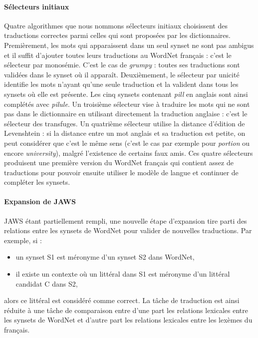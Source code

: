 \paragraph{Sélecteurs initiaux} Quatre algorithmes que nous nommons sélecteurs
initiaux choisissent des traductions correctes parmi celles qui sont proposées
par les dictionnaires. Premièrement, les mots qui apparaissent dans un seul
synset ne sont pas ambigus et il suffit d'ajouter toutes leurs traductions au
WordNet français : c'est le sélecteur par monosémie. C'est le cas de
\textit{grumpy} : toutes ses traductions sont validées dans le synset où il
apparaît. Deuxièmement, le sélecteur par unicité identifie les mots n'ayant
qu'une seule traduction et la valident dans tous les synsets où elle est
présente. Les cinq synsets contenant \textit{pill} en anglais sont ainsi
complétés avec \textit{pilule}. Un troisième sélecteur vise à traduire les mots
qui ne sont pas dans le dictionnaire en utilisant directement la traduction
anglaise : c'est le sélecteur des transfuges. Un quatrième sélecteur utilise la
distance d'édition de Levenshtein : si la distance entre un mot anglais et sa
traduction est petite, on peut considérer que c'est le même sens (c'est le cas
par exemple pour \textit{portion} ou encore \textit{university}), malgré
l'existence de certains faux amis. Ces quatre sélecteurs produisent une
première version du WordNet français qui contient assez de traductions pour
pouvoir ensuite utiliser le modèle de langue et continuer de compléter les
synsets.

\paragraph{Expansion de JAWS} JAWS étant partiellement rempli, une nouvelle étape d'expansion tire parti des relations entre les synsets de WordNet pour valider de nouvelles traductions. Par exemple, si :

\begin{itemize}
    \item un synset S1 est méronyme d'un synset S2 dans WordNet,
    \item il existe un contexte où un littéral dans S1 est méronyme d'un littéral candidat C dans S2,
\end{itemize}
alors ce littéral est considéré comme correct. La tâche de traduction est ainsi réduite à une tâche de comparaison entre d'une part les relations lexicales entre les synsets de WordNet et d'autre part les relations lexicales entre les lexèmes du français.

